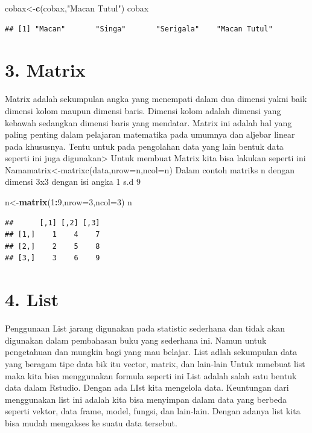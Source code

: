 \documentclass[
]{book}
\newenvironment{Shaded}{\begin{snugshade}}{\end{snugshade}}
\newcommand{\AttributeTok}[1]{\textcolor[rgb]{0.13,0.29,0.53}{#1}}
\newcommand{\DecValTok}[1]{\textcolor[rgb]{0.00,0.00,0.81}{#1}}
\newcommand{\FunctionTok}[1]{\textcolor[rgb]{0.13,0.29,0.53}{\textbf{#1}}}
\newcommand{\NormalTok}[1]{#1}
\newcommand{\OtherTok}[1]{\textcolor[rgb]{0.56,0.35,0.01}{#1}}
\newcommand{\SpecialCharTok}[1]{\textcolor[rgb]{0.81,0.36,0.00}{\textbf{#1}}}
\newcommand{\StringTok}[1]{\textcolor[rgb]{0.31,0.60,0.02}{#1}}
\theoremstyle{definition}
\theoremstyle{definition}
\theoremstyle{definition}
\theoremstyle{definition}
\theoremstyle{remark}
\begin{document}
\begin{Shaded}
\begin{Highlighting}[]
\NormalTok{cobax}\OtherTok{\textless{}{-}}\FunctionTok{c}\NormalTok{(cobax,}\StringTok{"Macan Tutul"}\NormalTok{)}
\NormalTok{cobax}
\end{Highlighting}
\end{Shaded}

\begin{verbatim}
## [1] "Macan"       "Singa"       "Serigala"    "Macan Tutul"
\end{verbatim}

\hypertarget{matrix}{%
\section*{3. Matrix}\label{matrix}}

Matrix adalah sekumpulan angka yang menempati dalam dua dimensi yakni baik dimensi kolom maupun dimensi baris. Dimensi kolom adalah dimensi yang kebawah sedangkan dimensi baris yang mendatar.
Matrix ini adalah hal yang paling penting dalam pelajaran matematika pada umumnya dan aljebar linear pada khususnya. Tentu untuk pada pengolahan data yang lain bentuk data seperti ini juga digunakan\textgreater{}
Untuk membuat Matrix kita bisa lakukan seperti ini
Namamatrix\textless-matrixc(data,nrow=n,ncol=n)
Dalam contoh matriks n dengan dimensi 3x3 dengan isi angka 1 s.d 9

\begin{Shaded}
\begin{Highlighting}[]
\NormalTok{n}\OtherTok{\textless{}{-}}\FunctionTok{matrix}\NormalTok{(}\DecValTok{1}\SpecialCharTok{:}\DecValTok{9}\NormalTok{,}\AttributeTok{nrow=}\DecValTok{3}\NormalTok{,}\AttributeTok{ncol=}\DecValTok{3}\NormalTok{)}
\NormalTok{n}
\end{Highlighting}
\end{Shaded}

\begin{verbatim}
##      [,1] [,2] [,3]
## [1,]    1    4    7
## [2,]    2    5    8
## [3,]    3    6    9
\end{verbatim}

\hypertarget{list}{%
\section*{4. List}\label{list}}

Penggunaan List jarang digunakan pada statistic sederhana dan tidak akan digunakan dalam pembahasan buku yang sederhana ini. Namun untuk pengetahuan dan mungkin bagi yang mau belajar. List adlah sekumpulan data yang beragam tipe data bik itu vector, matrix, dan lain-lain
Untuk mmebuat list maka kita bisa menggunakan formula seperti ini
List adalah salah satu bentuk data dalam Rstudio. Dengan ada LIst kita mengelola data. Keuntungan dari menggunakan list ini adalah kita bisa menyimpan dalam data yang berbeda seperti vektor, data frame, model, fungsi, dan lain-lain. Dengan adanya list kita bisa mudah mengakses ke suatu data tersebut.
\end{document}

